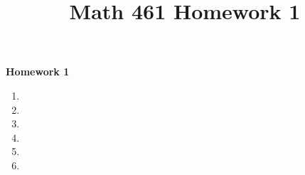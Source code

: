 \documentclass[oneside]{memoir}
\title{Math 461 Homework 1}
\begin{document}
\begin{center}
	\textbf{\large Homework 1} \\
\end{center}

\begin{enumerate}
	\item 
	\item 
	\item 
	\item 
	\item 
	\item 
\end{enumerate}
\end{document}
